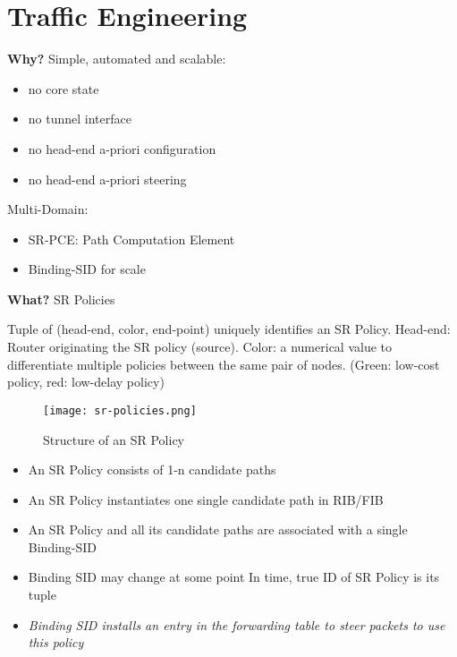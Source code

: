 \section{Traffic Engineering}
\label{chapter:srte}
\textbf{Why?} Simple, automated and scalable:
\begin{itemize}
    \item no core state
    \item no tunnel interface
    \item no head-end a-priori configuration
    \item no head-end a-priori steering
\end{itemize}

Multi-Domain:
\begin{itemize}
    \item SR-PCE: Path Computation Element
    \item Binding-SID for scale
\end{itemize}

\noindent
\textbf{What?} SR Policies

Tuple of \ttfamily (head-end, color, end-point) \rmfamily uniquely identifies an SR Policy.
Head-end: Router originating the SR policy (source).
Color: a numerical value to differentiate multiple policies between the same pair of nodes. (Green: low-cost policy, red: low-delay policy)

\begin{figure}[h]
    \texttt{[image: sr-policies.png]}
    \caption{Structure of an SR Policy}
\end{figure}

\begin{itemize}
    \item An SR Policy consists of 1-n candidate paths
    \item An SR Policy instantiates one single candidate path in RIB/FIB 
    \item An SR Policy and all its candidate paths are associated with a single Binding-SID
    \item Binding SID may change at  some point In time, true ID of SR Policy is its tuple
    \item \emph{Binding SID installs an entry in the forwarding table to steer packets to use this policy}
\end{itemize}


